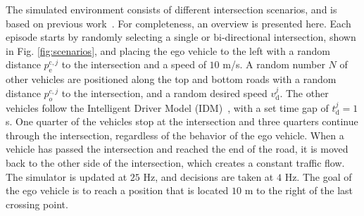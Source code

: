The simulated environment consists of different intersection scenarios, and is based on previous work~\cite{tram2019}. For completeness, an overview is presented here. Each episode starts by randomly selecting a single or bi-directional intersection, shown in Fig. \ref{fig:scenarios}, and placing the ego vehicle to the left with a random distance $p^{\mathrm{c},j}_\mathrm{e}$ to the intersection and a speed of $10$ m/s. A random number $N$ of other vehicles are positioned along the top and bottom roads with a random distance $p^{c,j}_o$ to the intersection, and a random desired speed $v_\mathrm{d}^j$. The other vehicles follow the Intelligent Driver Model (IDM)~\cite{idm2000}, with a set time gap of $t_\mathrm{d}^j=1$ s. One quarter of the vehicles stop at the intersection and three quarters continue through the intersection, regardless of the behavior of the ego vehicle. 
When a vehicle has passed the intersection and reached the end of the road, it is moved back to the other side of the intersection, which creates a constant traffic flow.
The simulator is updated at $25$ Hz, and decisions are taken at $4$ Hz.
The goal of the ego vehicle is to reach a position that is located $10$ m to the right of the last crossing point.




